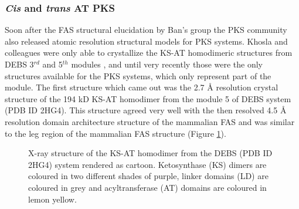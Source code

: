 \newpage		
		\subsubsection{\textit{Cis} and \textit{trans} AT PKS}
		\label{sec:ctPKS}
		Soon after the FAS structural elucidation by Ban's group the PKS community also released atomic resolution structural models for PKS systems. Khosla and colleagues were only able to crystallize the KS-AT homodimeric structures from DEBS 3$^{rd}$ and 5$^{th}$ modules \parencite{Tang2006, Tang2007}, and until very recently those were the only structures available for the PKS systems, which only represent part of the module. The first structure which came out was the 2.7 \AA{} resolution crystal structure of the 194 kD KS-AT homodimer from the module 5 of DEBS system (PDB ID 2HG4). This structure agreed very well with the then resolved 4.5 \AA{} resolution domain architecture structure of the mammalian FAS and was similar to the leg region of the mammalian FAS structure (Figure \ref{fig:debs2hg4tructure}). 

			\setlength\fboxsep{5pt}
 			\setlength\fboxrule{1.5pt}
			\begin{figure} []
			\centering
			\caption[X-ray structure of the KS-AT homodimer from the DEBS (PDB ID 2HG4) system rendered as cartoon]{X-ray structure of the KS-AT homodimer from the DEBS (PDB ID 2HG4) system rendered as cartoon. Ketosynthase (KS) dimers are coloured in two different shades of purple, linker domains (LD) are coloured in grey and acyltransferase (AT) domains are coloured in lemon yellow.}
			\label{fig:debs2hg4tructure}
			\end{figure}					
		
